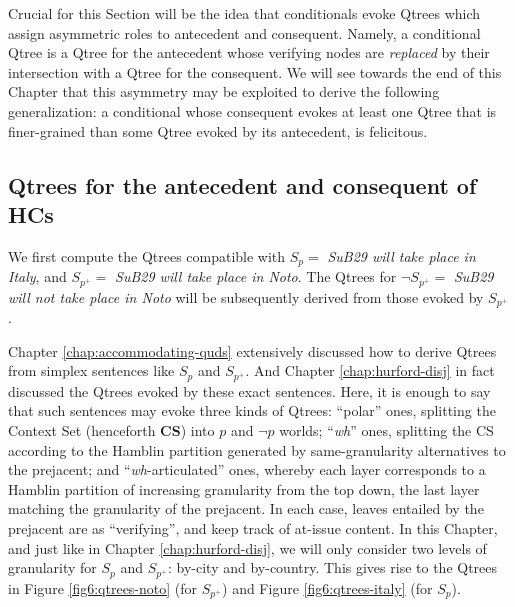 Crucial for this Section will be the idea that conditionals evoke Qtrees which assign asymmetric roles to antecedent and consequent. Namely, a conditional Qtree is a Qtree for the antecedent whose verifying nodes are \textit{replaced} by their intersection with a Qtree for the consequent. We will see towards the end of this Chapter that this asymmetry may be exploited to derive the following generalization: a conditional whose consequent evokes at least one Qtree that is finer-grained than some Qtree evoked by its antecedent, is felicitous.

\subsection{Qtrees for the antecedent and consequent of HCs}

We first compute the Qtrees compatible with $S_p = $ \textit{SuB29 will take place in Italy}, and $S_{p^+} = $ \textit{SuB29 will take place in Noto}. The Qtrees for $\neg S_{p^+} = $ \textit{SuB29 will not take place in Noto} will be subsequently derived from those evoked by $S_{p^+}$.

Chapter \ref{chap:accommodating-quds} extensively discussed how to derive Qtrees from simplex sentences like $S_p$ and $S_{p^+}$. And Chapter \ref{chap:hurford-disj} in fact discussed the Qtrees evoked by these exact sentences. Here, it is enough to say that such sentences may evoke three kinds of Qtrees: ``polar'' ones, splitting the Context Set (henceforth \textbf{CS}) into $p$ and $\neg p$ worlds; ``\textit{wh}'' ones, splitting the CS according to the Hamblin partition generated by same-granularity alternatives to the prejacent; and ``\textit{wh}-articulated'' ones, whereby each layer corresponds to a Hamblin partition of increasing granularity from the top down, the last layer matching the granularity of the prejacent. In each case, leaves entailed by the prejacent are \setlength{\fboxsep}{1pt} as ``verifying'', and keep track of at-issue content. In this Chapter, and just like in Chapter \ref{chap:hurford-disj}, we will only consider two levels of granularity for $S_p$ and $S_{p^+}$: by-city and by-country. This gives rise to the Qtrees in Figure \ref{fig6:qtrees-noto} (for $S_{p^+}$) and Figure \ref{fig6:qtrees-italy} (for $S_{p}$). 

